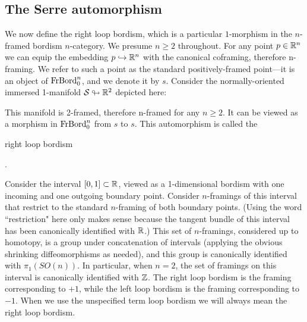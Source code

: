 \documentclass{amsart}
\begin{document}
\subsection{The Serre automorphism}  
We now define the right loop bordism, which is a particular $1$-morphism in the $n$-framed bordism $n$-category.  We presume $n \geq 2$ throughout.  For any point $p \in \mathbb R^n$ we can equip the embedding $p \hookrightarrow \mathbb R^n$ with the canonical coframing, therefore n-framing.  We refer to such a point as the standard positively-framed point---it is an object of $\mathrm{FrBord}_0^n$, and we denote it by $s$.  Consider the normally-oriented immersed 1-manifold $\mathcal S \looparrowright \mathbb R^2$ depicted here:
\begin{center}
\end{center}
\nid This manifold is 2-framed, therefore n-framed for any $n \geq 2$.  It can be viewed as a morphism in $\mathrm{FrBord}_0^n$ from $s$ to $s$.  This automorphism is called the \begin{bf}right loop bordism\end{bf}.  

\begin{remark}
Consider the interval $[0,1] \subset \mathbb R$, viewed as a 1-dimensional bordism with one incoming and one outgoing boundary point.  Consider $n$-framings of this interval that restrict to the standard $n$-framing of both boundary points.  (Using the word ``restriction" here only makes sense because the tangent bundle of this interval has been canonically identified with $\mathbb R$.)  This set of $n$-framings, considered up to homotopy, is a group under concatenation of intervals (applying the obvious shrinking diffeomorphisms as needed), and this group is canonically identified with $\pi_1(SO(n))$.  In particular, when $n=2$, the set of framings on this interval is canonically identified with $\mathbb Z$.  The right loop bordism is the framing corresponding to $+1$, while the left loop bordism is the framing corresponding to $-1$.  When we use the unspecified term loop bordism we will always mean the right loop bordism.
\end{remark}
\end{document}
